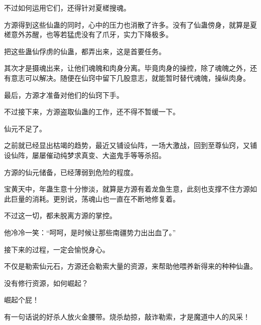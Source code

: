 \begin{this_body}
不过如何运用它们，还得针对夏槎搜魂。

方源得到这些仙蛊的同时，心中的压力也消散了许多。没有了仙蛊傍身，就算是夏槎意外苏醒，也等若猛虎没有了爪牙，实力下降极多。

把这些蛊仙俘虏的仙蛊，都弄出来，这是首要任务。

其次才是摄魂出来，让他们魂魄和肉身分离。毕竟肉身的操控，除了魂魄之外，还有意志可以解决。随便在仙窍中留下几股意志，就能暂时替代魂魄，操纵肉身。

最后，方源才准备对他们的仙窍下手。

不过接下来，方源盗取仙蛊的工作，还不得不暂缓一下。

仙元不足了。

之前就已经显出枯竭的趋势，最近又铺设仙阵，一场大激战，回到至尊仙窍，又铺设仙阵，屡屡催动纯梦求真变、大盗鬼手等等杀招。

方源的仙元储备，已经薄弱到危险的程度。

宝黄天中，年蛊生意十分惨淡，就算是方源有着龙鱼生意，此刻也支撑不住方源如此巨量的消耗。更别说，荡魂山也一直在不断地修复着。

不过这一切，都未脱离方源的掌控。

他冷冷一笑：“呵呵，是时候让那些南疆势力出出血了。”

接下来的过程，一定会愉悦身心。

不仅是勒索仙元石，方源还会勒索大量的资源，来帮助他喂养新得来的种种仙蛊。

没有修行资源，如何崛起？

崛起个屁！

有一句话说的好杀人放火金腰带。烧杀劫掠，敲诈勒索，才是魔道中人的风采！

\end{this_body}

